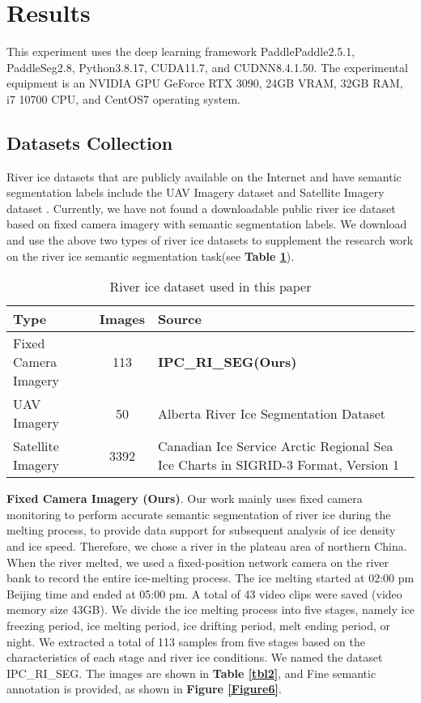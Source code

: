 \documentclass[a4paper,fleqn]{cas-dc}
\begin{document}
\section{Results}

This experiment uses the deep learning framework PaddlePaddle2.5.1, PaddleSeg2.8, Python3.8.17, CUDA11.7, and CUDNN8.4.1.50. The experimental equipment is an NVIDIA GPU GeForce RTX 3090, 24GB VRAM, 32GB RAM, i7 10700 CPU, and CentOS7 operating system.

\subsection{Datasets Collection}

River ice datasets that are publicly available on the Internet and have semantic segmentation labels include the UAV Imagery dataset \cite{ebax-1h44-19} and Satellite Imagery dataset \cite{Canadian_Ice_Service_2009} . Currently, we have not found a downloadable public river ice dataset based on fixed camera imagery with semantic segmentation labels. We download and use the above two types of river ice datasets to supplement the research work on the river ice semantic segmentation task(see \textbf{Table \ref{tbl1}}).

\begin{table}[h]
	\centering
	\caption{River ice dataset used in this paper}\label{tbl1}
	\begin{tabular*}{\tblwidth}{@{}p{3cm} c p{3.2cm}@{}}
		\toprule
		Type & Images & Source \\
		\midrule
		Fixed Camera Imagery & 113 & \textbf{IPC\_RI\_SEG(Ours)} \\
		UAV Imagery & 50 & \multicolumn{1}{m{3.2cm}}{Alberta River Ice Segmentation Dataset} \\
		Satellite Imagery & 3392 & \multicolumn{1}{m{3.2cm}}{Canadian Ice Service Arctic Regional Sea Ice Charts in SIGRID-3 Format, Version 1} \\
		\bottomrule
	\end{tabular*}
\end{table}

\textbf{Fixed Camera Imagery (Ours)}. Our work mainly uses fixed camera monitoring to perform accurate semantic segmentation of river ice during the melting process, to provide data support for subsequent analysis of ice density and ice speed. Therefore, we chose a river in the plateau area of northern China. When the river melted, we used a fixed-position network camera on the river bank to record the entire ice-melting process. The ice melting started at 02:00 pm Beijing time and ended at 05:00 pm. A total of 43 video clips were saved (video memory size 43GB). We divide the ice melting process into five stages, namely ice freezing period, ice melting period, ice drifting period, melt ending period, or night. We extracted a total of 113 samples from five stages based on the characteristics of each stage and river ice conditions. We named the dataset IPC\_RI\_SEG. The images are shown in \textbf{Table \ref{tbl2}}, and Fine semantic annotation is provided, as shown in \textbf{Figure \ref{Figure6}}.
\end{document}
